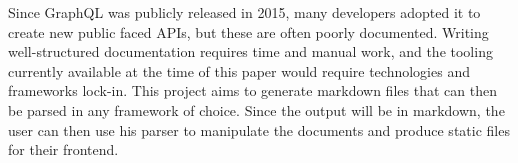 Since GraphQL was publicly released in 2015, many developers adopted it to create new public faced APIs,
but these are often poorly documented. Writing well-structured documentation requires time and manual work,
and the tooling currently available at the time of this paper would require technologies and frameworks lock-in.
This project aims to generate markdown files that can then be parsed in any framework of choice.
Since the output will be in markdown, the user can then use his parser to manipulate the documents and produce static
files for their frontend.
